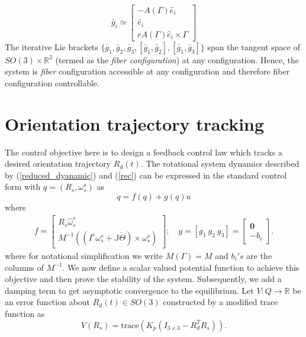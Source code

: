 \documentclass{ifacconf}
\begin{document}
\begin{equation}
\bar{g}_{i} \simeq \begin{bmatrix}
- A(\Gamma)\hat{e}_{i} \\
\hat{e}_{i} \\
r A(\Gamma)\hat{e}_{i} \times \Gamma
\end{bmatrix}
\end{equation}
The iterative Lie brackets $\{\bar{g}_{1}, \bar{g}_{2}, \bar{g}_{3}, [\bar{g}_{1},\bar{g}_{2}], [\bar{g}_{1},\bar{g}_{3}] \}$ span the tangent space of $SO(3) \times \mathbb{R}^{2}$ (termed as the \textit{fiber configuration}) at any configuration. Hence, the system is \textit{fiber} configuration accessible at any configuration and therefore fiber configuration controllable. 
\section{Orientation trajectory tracking}
The control objective here is to design a feedback control law which tracks a desired orientation trajectory $R_{d}(t)$.  The rotational system dynamics described by (\ref{reduced_dyanamic}) and (\ref{rec}) can be expressed in the standard control form with $q = (R_{s},\omega_{s}^{s})$ as
\begin{equation}\label{control_equation2}
\dot{q} = f(q) + g(q)u
\end{equation}
where
\begin{align*}
f = \begin{bmatrix}
R_{s}\widehat{\omega}_{s}^{s} \\
M^{-1}\left(  (I^{s}\omega_{s}^{s} + \mathbb{J}\dot{\Theta}) \times \omega_{s}^{s}\right) 
\end{bmatrix}; \quad
g = [g_{1}~ g_{2}~ g_{3}] = \begin{bmatrix}
\mathbf{0} \\
-b_{i}
\end{bmatrix}. 
\end{align*}
where for notational simplification we write $M(\Gamma)=M$ and $b_{i}'s$ are the columns of $M^{-1}$.
We now define a scalar valued potential function to achieve this objective and then prove the stability of the system. Subsequently, we add a damping term to get asymptotic convergence to the equilibrium. Let $V: Q \longrightarrow \mathbb{R}$ be an error function about $R_{d}(t)\in SO(3)$ constructed by a modified trace function as
\begin{equation}
V(R_{s}) = \mbox{trace}(K_{p}(I_{3\times 3} -  R_{d}^{T}R_{s})).
\end{equation}
\end{document}
